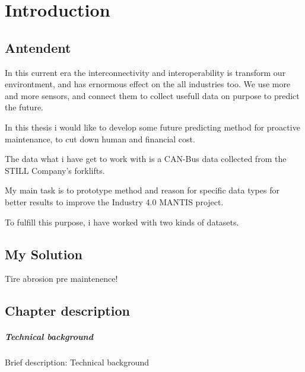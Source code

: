 \chapter*{Introduction}
\section{Antendent}
In this current era the interconnectivity and interoperability is transform our environtment, and has ernormous effect on the all industries too. We use more and more sensors, and connect them to collect usefull data on purpose to predict the future.

In this thesis i would like to develop some future predicting method for proactive maintenance, to cut down human and financial cost.

The data what i have get to work with is a CAN-Bus data collected from the STILL Company's forklifts.

My main task is to prototype method and reason for specific data types for better results to improve the Industry 4.0 MANTIS project.

To fulfill this purpose, i have worked with two kinds of datasets.
\section{My Solution}

Tire abrosion pre maintenence!


\section{Chapter description}
		\paragraph{Technical background}

Brief description: Technical background

